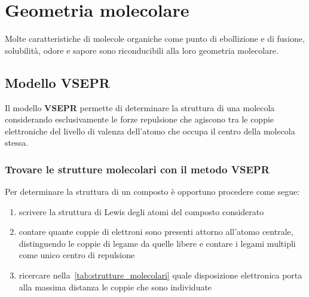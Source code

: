\section{Geometria molecolare}
Molte caratteristiche di molecole organiche come punto di ebollizione e di fusione, solubilità, odore e sapore sono riconducibili alla loro geometria molecolare.

\subsection{Modello VSEPR}
Il modello \textbf{\Ac{VSEPR}} permette di determinare la struttura di una molecola considerando esclusivamente le forze repulsione che agiscono tra le coppie elettroniche del livello di valenza dell'atomo che occupa il centro della molecola stessa.

\subsubsection{Trovare le strutture molecolari con il metodo VSEPR}
Per determinare la struttura di un composto è opportuno procedere come segue:
\begin{enumerate}
	\item scrivere la struttura di Lewis degli atomi del composto considerato
	\item contare quante coppie di elettroni sono presenti attorno all'atomo centrale, distinguendo le coppie di legame da quelle libere e contare i legami multipli come unico centro di repulsione
	\item ricercare nella~\autoref{tab:strutture_molecolari} quale disposizione elettronica porta alla massima distanza le coppie che sono individuate
\end{enumerate}


